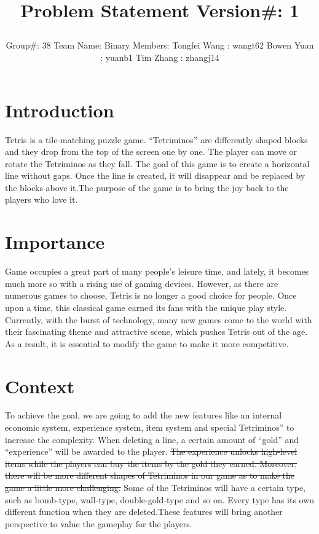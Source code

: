 \documentclass[12pt,letterpaper]{article}
\title{\parbox{\linewidth}{\centering Problem Statement \endgraf\bigskip Version\#: 1}}
\author{\parbox{\linewidth}{\bigskip \centering Group\#: 38 \endgraf\bigskip Team Name: Binary \endgraf\bigskip Members: \endgraf\bigskip Tongfei Wang : wangt62 \endgraf\bigskip Bowen Yuan : yuanb1 \endgraf\bigskip Tim Zhang : zhangj14}}
\date{\parbox{\linewidth}{\bigskip\bigskip \centering \today\endgraf\bigskip SFWR ENG 3XA3 \endgraf\bigskip McMaster University}}
\newcommand\tab[1][1cm]{\hspace*{#1}}
\begin{document}
\maketitle
\newpage

\section{Introduction}


\tab Tetris is a tile-matching puzzle game. “Tetriminos” are differently shaped blocks and they drop from the top of the screen one by one. The player can move or rotate the Tetriminos as they fall. The goal of this game is to create a horizontal line without gaps. Once the line is created, it will disappear and be replaced by the blocks above it.The purpose of the game is to bring the joy back to the players who love it.



\section{Importance}


\tab	Game occupies a great part of many people's leisure time, and lately, it becomes much more so with a rising use of gaming devices. However, as there are numerous games to choose, Tetris is no longer a good choice for people. Once upon a time, this classical game earned its fans with the unique play style. Currently, with the burst of technology, many new games come to the world with their fascinating theme and attractive scene, which pushes Tetris out of the age.  As a result, it is essential to modify the game to make it more competitive.


\section{Context}


\tab	To achieve the goal, we are going to add the new features like an internal economic system, experience system, item system and special Tetriminos” to increase the complexity. When deleting a line, a certain amount of “gold” and “experience” will be awarded to the player. \st{The experience unlocks high-level items while the players can buy the items by the gold they earned. Moreover, there will be more different shapes of Tetriminos in our game as to make the game a little more challenging.} Some of the Tetriminos will have a certain type, such as bomb-type, wall-type, double-gold-type and so on. Every type has its own different function when they are deleted.These features will bring another perspective to value the gameplay for the players.
\end{document}
